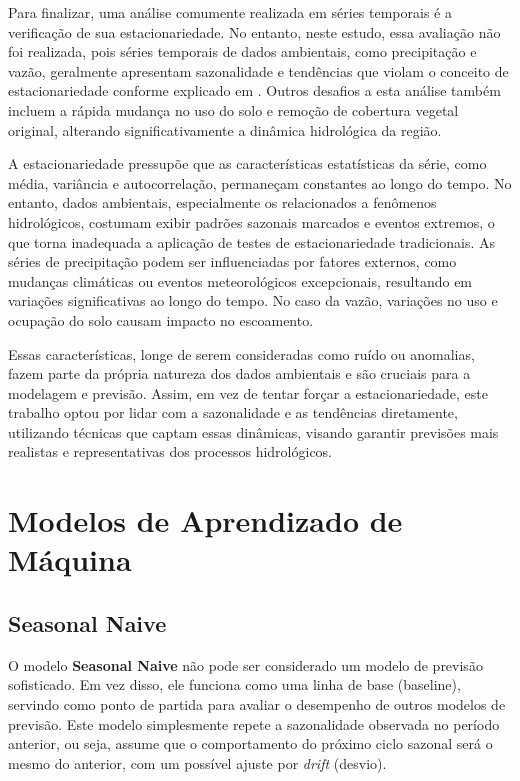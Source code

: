 Para finalizar, uma análise comumente realizada em séries temporais é a verificação de sua estacionariedade. No entanto, neste estudo, essa avaliação não foi realizada, pois séries temporais de dados ambientais, como precipitação e vazão, geralmente apresentam sazonalidade e tendências que violam o conceito de estacionariedade conforme explicado em \citet{hyndman_fpp3_2024e}. Outros desafios a esta análise também incluem a rápida mudança no uso do solo e remoção de cobertura vegetal original, alterando significativamente a dinâmica hidrológica da região.\cite{rayyan-33388453}

A estacionariedade pressupõe que as características estatísticas da série, como média, variância e autocorrelação, permaneçam constantes ao longo do tempo. No entanto, dados ambientais, especialmente os relacionados a fenômenos hidrológicos, costumam exibir padrões sazonais marcados e eventos extremos, o que torna inadequada a aplicação de testes de estacionariedade tradicionais. As séries de precipitação podem ser influenciadas por fatores externos, como mudanças climáticas ou eventos meteorológicos excepcionais, resultando em variações significativas ao longo do tempo. No caso da vazão, variações no uso e ocupação do solo causam impacto no escoamento.

Essas características, longe de serem consideradas como ruído ou anomalias, fazem parte da própria natureza dos dados ambientais e são cruciais para a modelagem e previsão. Assim, em vez de tentar forçar a estacionariedade, este trabalho optou por lidar com a sazonalidade e as tendências diretamente, utilizando técnicas que captam essas dinâmicas, visando garantir previsões mais realistas e representativas dos processos hidrológicos.

\section{Modelos de Aprendizado de Máquina}

\subsection{Seasonal Naive}

O modelo \textbf{Seasonal Naive} não pode ser considerado um modelo de previsão sofisticado. Em vez disso, ele funciona como uma linha de base (baseline), servindo como ponto de partida para avaliar o desempenho de outros modelos de previsão. Este modelo simplesmente repete a sazonalidade observada no período anterior, ou seja, assume que o comportamento do próximo ciclo sazonal será o mesmo do anterior, com um possível ajuste por \textit{drift} (desvio).\cite{hyndman_fpp3_2024d}

